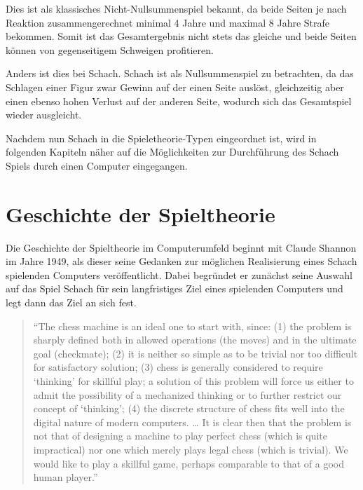 Dies ist als klassisches Nicht-Nullsummenspiel bekannt, da beide Seiten je nach Reaktion zusammengerechnet minimal 4 Jahre und maximal 8 Jahre Strafe bekommen. Somit ist das Gesamtergebnis nicht stets das gleiche und beide Seiten können von gegenseitigem Schweigen profitieren.

Anders ist dies bei Schach. Schach ist als Nullsummenspiel zu betrachten, da das Schlagen einer Figur zwar Gewinn auf der einen Seite auslöst, gleichzeitig aber einen ebenso hohen Verlust auf der anderen Seite, wodurch sich das Gesamtspiel wieder ausgleicht.

Nachdem nun Schach in die Spieletheorie-Typen eingeordnet ist, wird in folgenden Kapiteln näher auf die Möglichkeiten zur Durchführung des Schach Spiels durch einen Computer eingegangen.



\section{Geschichte der Spieltheorie}\label{history}

Die Geschichte der Spieltheorie im Computerumfeld beginnt mit Claude Shannon im Jahre 1949, als dieser seine Gedanken zur möglichen Realisierung eines Schach spielenden Computers veröffentlicht. Dabei begründet er zunächst seine Auswahl auf das Spiel Schach für sein langfristiges Ziel eines spielenden Computers und legt dann das Ziel an sich fest.

\begin{quote}
“The chess machine is an ideal one to start with, since: (1) the problem is sharply defined both in allowed operations (the moves) and in the ultimate goal (checkmate); (2) it is neither so simple as to be trivial nor too difficult for satisfactory solution; (3) chess is generally considered to require ‘thinking’ for skillful play; a solution of this problem will force us either to admit the possibility of a mechanized thinking or to further restrict our concept of ‘thinking’; (4) the discrete structure of chess fits well into the digital nature of modern computers. … It is clear then that the problem is not that of designing a machine to play perfect chess (which is quite impractical) nor one which merely plays legal chess (which is trivial). We would like to play a skillful game, perhaps comparable to that of a good human player.” \cite{Shannon1950}
\end{quote} 

